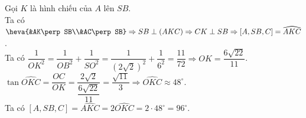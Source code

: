 \begin{ex}
{\begin{itemchoice}
			\itemch Gọi $K$ là hình chiếu của $A$ lên $SB$.\\
			Ta có $\heva{&AK\perp SB\\&AC\perp SB}\Rightarrow SB \perp (AKC)\Rightarrow CK\perp SB\Rightarrow [A,SB,C]=\widehat{AKC}$.\\
			Ta có $\dfrac{1}{OK^2}=\dfrac{1}{OB^2}+\dfrac{1}{SO^2}=\dfrac{1}{\left(2\sqrt{2}\right)^2}+\dfrac{1}{6^2}=\dfrac{11}{72}\Rightarrow OK=\dfrac{6\sqrt{22}}{11}$.\\
			$\tan \widehat{OKC}=\dfrac{OC}{OK}=\dfrac{2\sqrt{2}}{\dfrac{6\sqrt{22}}{11}}=\dfrac{\sqrt{11}}{3}\Rightarrow \widehat{OKC}\approx 48^\circ$.\\
			Ta có $[A,SB,C]=\widehat{AKC}=2\widehat{OKC}=2\cdot 48^\circ=96^\circ$.
		\end{itemchoice}
	}
\end{ex}

